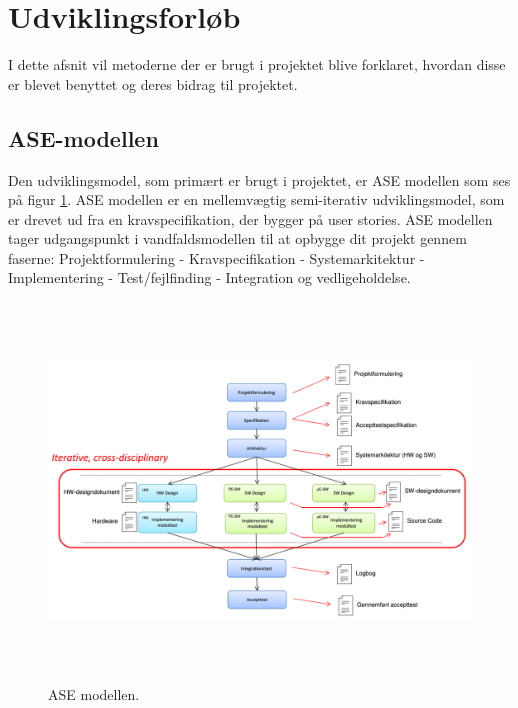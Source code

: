 \section{Udviklingsforløb}
I dette afsnit vil metoderne der er brugt i projektet blive forklaret, hvordan disse er blevet benyttet og deres bidrag til projektet.

\subsection{ASE-modellen} \label{sec:ASEModel}
Den udviklingsmodel, som primært er brugt i projektet, er ASE modellen som ses på figur \ref{fig:ASE}. ASE modellen \cite{ASE} er en mellemvægtig semi-iterativ udviklingsmodel, som er drevet ud fra en kravspecifikation, der bygger på user stories. ASE modellen tager udgangspunkt i vandfaldsmodellen til at opbygge dit projekt gennem faserne: Projektformulering - Kravspecifikation - Systemarkitektur -  Implementering -  Test/fejlfinding -  Integration og vedligeholdelse\cite{ASE}.

\begin{figure} [H]
	\begin{center}
		\includegraphics[height=10cm, width=12cm]{Udviklingsforlob/ASEModellen}
	\end{center}
	\caption{ASE modellen. \cite{ASE}}
	\label{fig:ASE}
\end{figure}

